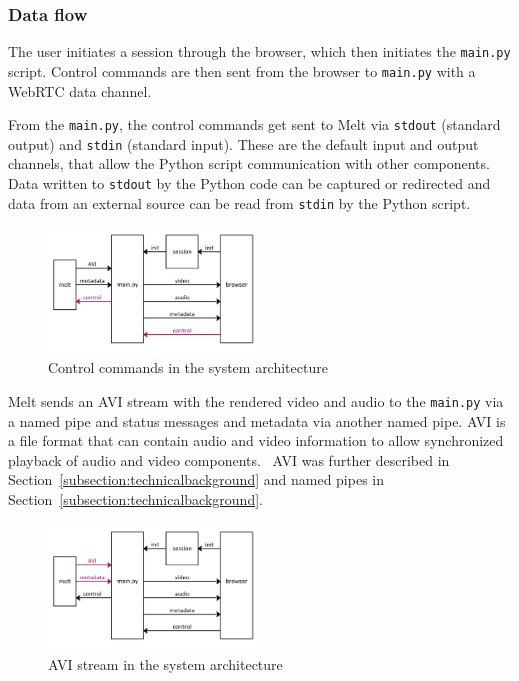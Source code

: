 \documentclass[../MasterThesis.tex]{subfiles}
\begin{document}
\subsubsection{Data flow}

The user initiates a session through the browser, which then initiates the \texttt{main.py} script.
Control commands are then sent from the browser to \texttt{main.py} with a WebRTC data channel.

From the \texttt{main.py}, the control commands get sent to Melt via \texttt{stdout} (standard output) and \texttt{stdin} (standard input). These are the default input and output channels, that allow the Python script communication with other components.
Data written to \texttt{stdout} by the Python code can be captured or redirected and data from an external source can be read from \texttt{stdin} by the Python script.~\cite{python}

\begin{figure}[H]
	\centering
	\includegraphics[width=0.5\textwidth]{IM_control.png}
	\caption{Control commands in the system architecture}
	
\end{figure}


Melt sends an AVI stream with the rendered video and audio to the \texttt{main.py} via a named pipe and status messages and metadata via another named pipe.
AVI is a file format that can contain audio and video information to allow synchronized playback of audio and video components.~\cite{avi} AVI was further described in Section~\ref{subsection:technicalbackground} and named pipes in Section~\ref{subsection:technicalbackground}.

\begin{figure}[H]
	\centering
	\includegraphics[width=0.5\textwidth]{IM_avi.png}
	\caption{AVI stream in the system architecture}
\end{figure}
\end{document}
